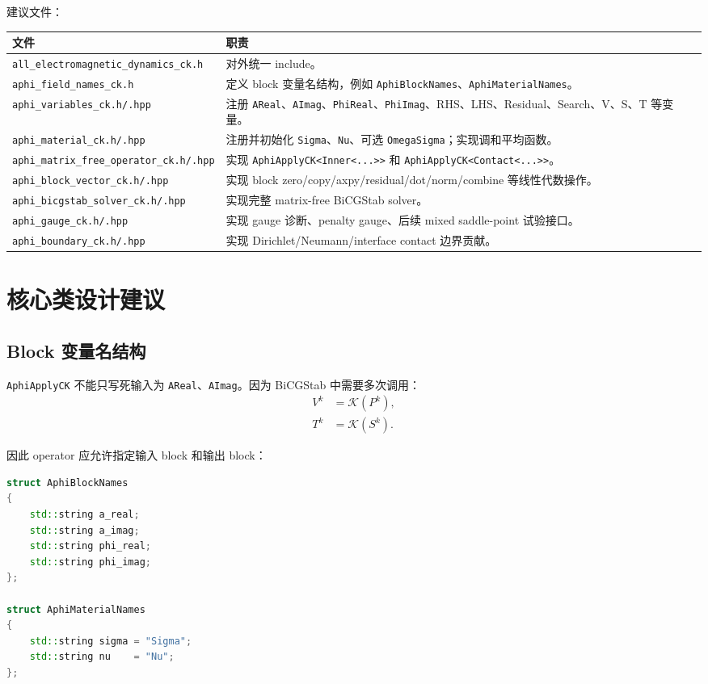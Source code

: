 \documentclass[UTF8,a4paper,11pt]{ctexart}
\newcommand{\code}[1]{\texttt{#1}}
\newcommand{\Kop}{\mathcal K}
\begin{document}
建议文件：
\begin{longtable}{p{}p{}}
\toprule
文件 & 职责 \\
\midrule
\code{all\_electromagnetic\_dynamics\_ck.h} & 对外统一 include。 \\
\code{aphi\_field\_names\_ck.h} & 定义 block 变量名结构，例如 \code{AphiBlockNames}、\code{AphiMaterialNames}。 \\
\code{aphi\_variables\_ck.h/.hpp} & 注册 \code{AReal}、\code{AImag}、\code{PhiReal}、\code{PhiImag}、RHS、LHS、Residual、Search、V、S、T 等变量。 \\
\code{aphi\_material\_ck.h/.hpp} & 注册并初始化 \code{Sigma}、\code{Nu}、可选 \code{OmegaSigma}；实现调和平均函数。 \\
\code{aphi\_matrix\_free\_operator\_ck.h/.hpp} & 实现 \code{AphiApplyCK<Inner<...>>} 和 \code{AphiApplyCK<Contact<...>>}。 \\
\code{aphi\_block\_vector\_ck.h/.hpp} & 实现 block zero/copy/axpy/residual/dot/norm/combine 等线性代数操作。 \\
\code{aphi\_bicgstab\_solver\_ck.h/.hpp} & 实现完整 matrix-free BiCGStab solver。 \\
\code{aphi\_gauge\_ck.h/.hpp} & 实现 gauge 诊断、penalty gauge、后续 mixed saddle-point 试验接口。 \\
\code{aphi\_boundary\_ck.h/.hpp} & 实现 Dirichlet/Neumann/interface contact 边界贡献。 \\
\bottomrule
\end{longtable}

\section{核心类设计建议}

\subsection{Block 变量名结构}

\code{AphiApplyCK} 不能只写死输入为 \code{AReal}、\code{AImag}。因为 BiCGStab 中需要多次调用：
\begin{align}
V^k&=\Kop(P^k),\\
T^k&=\Kop(S^k).
\end{align}

因此 operator 应允许指定输入 block 和输出 block：
\begin{lstlisting}[language=C++]
struct AphiBlockNames
{
    std::string a_real;
    std::string a_imag;
    std::string phi_real;
    std::string phi_imag;
};

struct AphiMaterialNames
{
    std::string sigma = "Sigma";
    std::string nu    = "Nu";
};
\end{lstlisting}
\end{document}
